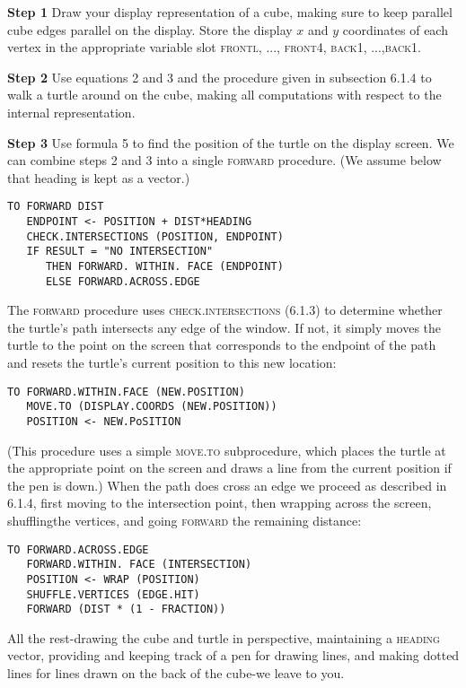 \documentclass{book}
\begin{document}
\noindent \textbf{Step 1} Draw your display representation of a cube, making sure to keep
parallel cube edges parallel on the display. Store the display $x$ and $y$
coordinates of each vertex in the appropriate variable slot \textsc{frontl}, ...,
\textsc{front4}, \textsc{back1}, ...,\textsc{back1}.

\noindent \textbf{Step 2} Use equations 2 and 3 and the procedure given in subsection
6.1.4 to walk a turtle around on the cube, making all computations with
respect to the internal representation.

\noindent \textbf{Step 3} Use formula 5 to find the position of the turtle on the display
screen.
We can combine steps 2 and 3 into a single \textsc{forward} procedure. (We
assume below that heading is kept as a vector.)

\begin{verbatim}
TO FORWARD DIST
   ENDPOINT <- POSITION + DIST*HEADING
   CHECK.INTERSECTIONS (POSITION, ENDPOINT)
   IF RESULT = "NO INTERSECTION"
      THEN FORWARD. WITHIN. FACE (ENDPOINT)
      ELSE FORWARD.ACROSS.EDGE
\end{verbatim}
The \textsc{forward} procedure uses \textsc{check}\textsc{.intersections} (6.1.3) to determine whether the turtle's path intersects any edge of the window. If not,
it simply moves the turtle to the point on the screen that corresponds to
the endpoint of the path and resets the turtle's current position to this
new location:

\begin{verbatim}
TO FORWARD.WITHIN.FACE (NEW.POSITION)
   MOVE.TO (DISPLAY.COORDS (NEW.POSITION))
   POSITION <- NEW.PoSITION
\end{verbatim}
(This procedure uses a simple \textsc{move}\textsc{.to} subprocedure, which places the
turtle at the appropriate point on the screen and draws a line from the
current position if the pen is down.)
When the path does cross an edge we proceed as described in 6.1.4,
first moving to the intersection point, then wrapping across the screen,
shufflingthe vertices, and going \textsc{forward} the remaining distance:

\begin{verbatim}
TO FORWARD.ACROSS.EDGE
   FORWARD.WITHIN. FACE (INTERSECTION)
   POSITION <- WRAP (POSITION)
   SHUFFLE.VERTICES (EDGE.HIT)
   FORWARD (DIST * (1 - FRACTION))
\end{verbatim}
All the rest-drawing the cube and turtle in perspective, maintaining
a \textsc{heading} vector, providing and keeping track of a pen for drawing lines,
and making dotted lines for lines drawn on the back of the cube-we
leave to you.
\end{document}
